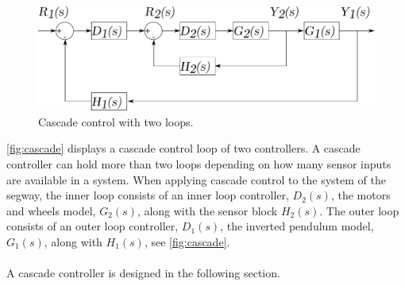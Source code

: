 \begin{figure}[H]
\centering
\includegraphics[scale=0.5]{figures/cascade.pdf}
\caption{Cascade control with two loops. \label{fig:cascade}} 
\end{figure}
\autoref{fig:cascade} displays a cascade control loop of two controllers. A cascade controller can hold more than two loops depending on how many sensor inputs are available in a system. %
When applying cascade control to the system of the segway, the inner loop consists of an inner loop controller, $D_2(s)$, the motors and wheels model, $G_2(s)$, along with the sensor block $H_2(s)$. The outer loop consists of an outer loop controller, $D_1(s)$, the inverted pendulum model, $G_1(s)$, along with $H_1(s)$, see \autoref{fig:cascade}.\\\\ 
A cascade controller is designed in the following section.